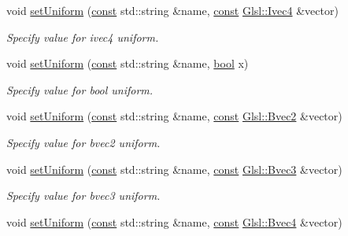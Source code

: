 \begin{DoxyCompactItemize}
void \hyperlink{classsf_1_1_shader_a380e7a5a2896162c5fd08966c4523790}{set\-Uniform} (\hyperlink{term__entry_8h_a57bd63ce7f9a353488880e3de6692d5a}{const} std\-::string \&name, \hyperlink{term__entry_8h_a57bd63ce7f9a353488880e3de6692d5a}{const} \hyperlink{namespacesf_1_1_glsl_abcba8791f75382199ea03f6932a91d9b}{Glsl\-::\-Ivec4} \&vector)
\begin{DoxyCompactList}\small\item\em Specify value for {\ttfamily ivec4} uniform. \end{DoxyCompactList}\item 
void \hyperlink{classsf_1_1_shader_af417027ac72c06e6cfbf30975cd678e9}{set\-Uniform} (\hyperlink{term__entry_8h_a57bd63ce7f9a353488880e3de6692d5a}{const} std\-::string \&name, \hyperlink{term__entry_8h_a002004ba5d663f149f6c38064926abac}{bool} x)
\begin{DoxyCompactList}\small\item\em Specify value for {\ttfamily bool} uniform. \end{DoxyCompactList}\item 
void \hyperlink{classsf_1_1_shader_ab2518b8dd0762e682b452a5d5005f2bf}{set\-Uniform} (\hyperlink{term__entry_8h_a57bd63ce7f9a353488880e3de6692d5a}{const} std\-::string \&name, \hyperlink{term__entry_8h_a57bd63ce7f9a353488880e3de6692d5a}{const} \hyperlink{namespacesf_1_1_glsl_a59d8cf909c3d71ebf3db057480b464da}{Glsl\-::\-Bvec2} \&vector)
\begin{DoxyCompactList}\small\item\em Specify value for {\ttfamily bvec2} uniform. \end{DoxyCompactList}\item 
void \hyperlink{classsf_1_1_shader_ab06830875c82476fbb9c975cdeb78a11}{set\-Uniform} (\hyperlink{term__entry_8h_a57bd63ce7f9a353488880e3de6692d5a}{const} std\-::string \&name, \hyperlink{term__entry_8h_a57bd63ce7f9a353488880e3de6692d5a}{const} \hyperlink{namespacesf_1_1_glsl_a4166ffc506619b4912d576e6eba2c957}{Glsl\-::\-Bvec3} \&vector)
\begin{DoxyCompactList}\small\item\em Specify value for {\ttfamily bvec3} uniform. \end{DoxyCompactList}\item 
void \hyperlink{classsf_1_1_shader_ac8db3e0adf1129abf24f0a51a7ec36f4}{set\-Uniform} (\hyperlink{term__entry_8h_a57bd63ce7f9a353488880e3de6692d5a}{const} std\-::string \&name, \hyperlink{term__entry_8h_a57bd63ce7f9a353488880e3de6692d5a}{const} \hyperlink{namespacesf_1_1_glsl_a5f4f38e06558ae1baa610b119e45ea0b}{Glsl\-::\-Bvec4} \&vector)

\end{DoxyCompactItemize}
